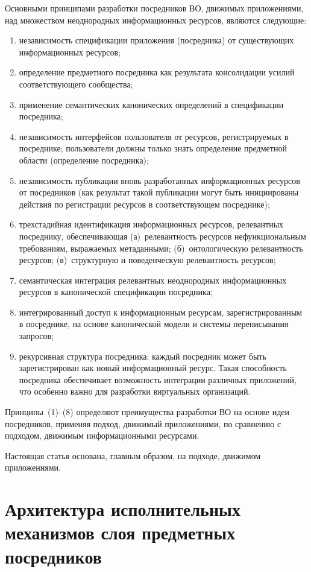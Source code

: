 \begin{multicols}{2}
     Основными принципами разработки посредников ВО, движимых приложениями,
над множеством неоднородных информационных ресурсов, являются следующие:
     \begin{enumerate}[(1)]
\item независимость спецификации приложения (посредника) от существующих
информационных ресурсов;
\item определение предметного посредника как результата консолидации усилий
со\-от\-вет\-ст\-ву\-юще\-го сообщества;
\item применение семантических канонических определений в спецификации
посредника;
\item независимость интерфейсов пользователя от ресурсов, регистрируемых в
посреднике; пользователи должны только знать определение пред\-мет\-ной области
(определение по\-сред\-ника);
\item независимость публикации вновь разработанных информационных ресурсов от
посредников (как результат такой публикации могут быть инициированы действия по
регистрации ресурсов в соответствующем посреднике);
\item трехстадийная идентификация информаци\-онных ресурсов, релевантных
посреднику, обеспечивающая (а)~релевантность ресурсов нефункциональным
требованиям, выражаемых метаданными; (б)~онтологическую релевантность ресурсов;
(в)~структурную и поведенческую релевантность ресурсов;
\item семантическая интеграция релевантных неоднородных информационных
ресурсов в канонической спецификации посредника;
\item интегрированный доступ к информационным ресурсам, зарегистрированным в
посреднике, на основе канонической модели и системы переписывания запросов;
\item рекурсивная структура посредника: каждый посредник может быть
зарегистрирован как новый информационный ресурс. Такая способность посредника
обеспечивает возможность интеграции различных приложений, что особенно важно
для разработки виртуальных организаций.
\end{enumerate}

     Принципы~(1)--(8) определяют преимущества разработки ВО на основе идеи
посредников, применяя подход, движимый приложениями, по сравнению с подходом,
движимым информационными ресурсами.

     Настоящая статья основана, главным образом, на подходе, движимом
приложениями.

\section{Архитектура исполнительных механизмов слоя предметных посредников}


\end{multicols}
